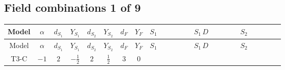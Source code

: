 \documentclass[8pt]{article}
\begin{document}
\begin{landscape}
\subsection*{Field combinations 1 of 9}
\begin{longtable}{@{}cccccccc >{\raggedright\arraybackslash}p{0.21\linewidth} >{\raggedright\arraybackslash}p{0.21\linewidth} >{\raggedright\arraybackslash}p{0.21\linewidth}@{}}
\toprule
Model & $\alpha$ & $d_{S_1}$ & $Y_{S_1}$ & $d_{S_2}$ & $Y_{S_2}$ & $d_F$ & $Y_F$ & $S_1$ & $S_1\,D$ & $S_2$ \\
\midrule
\endfirsthead
\toprule
Model & $\alpha$ & $d_{S_1}$ & $Y_{S_1}$ & $d_{S_2}$ & $Y_{S_2}$ & $d_F$ & $Y_F$ & $S_1$ & $S_1\,D$ & $S_2$ \\
\midrule
\endhead
T3-C & $-1$ & $2$ & $-\frac{1}{2}$ & $2$ & $\frac{1}{2}$ & $3$ & $0$ & \scriptsize\adjustbox{max width=\linewidth}{$\begin{gathered} -C_{S_1^\dagger S_1} S_{1,j_1} S_{1,j_1}{}^{\dagger } \\ +\frac{1}{2} \sqrt{3} C_{S_1^\dagger S_1} \hbar  \overline{y_{1,i_1,r_1}} S_{1,j_1} y_{1,i_1,r_1} S_{1,j_1}{}^{\dagger } \\ +\frac{\sqrt{3} C_{S_1^\dagger S_1} \hbar  \overline{y_{1,i_1,r_1}} S_{1,j_1} y_{1,i_1,r_1} S_{1,j_1}{}^{\dagger }}{\epsilon }\end{gathered}$} & \scriptsize\adjustbox{max width=\linewidth}{$\begin{gathered} +D_{\mu _1}\left(S_{1,j_1}\right){}^{\dagger } D_{\mu _1}\left(S_{1,j_1}\right)\end{gathered}$} & \scriptsize\adjustbox{max width=\linewidth}{$\begin{gathered} -C_{S_2^\dagger S_2} S_{2,j_1} S_{2,j_1}{}^{\dagger } \\ +\frac{1}{2} \sqrt{3} C_{S_2^\dagger S_2} \hbar  \overline{y_{2,i_1,r_1}} S_{2,j_1} y_{2,i_1,r_1} S_{2,j_1}{}^{\dagger } \\ +\frac{\sqrt{3} C_{S_2^\dagger S_2} \hbar  \overline{y_{2,i_1,r_1}} S_{2,j_1} y_{2,i_1,r_1} S_{2,j_1}{}^{\dagger }}{\epsilon }\end{gathered}$} \\

\end{longtable}
\end{landscape}
\end{document}
